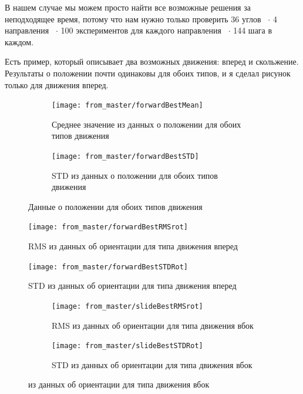 В нашем случае мы можем просто найти все возможные решения за неподходящее время, потому что нам нужно только проверить 36 углов ~$\cdot$ 4 направления ~$\cdot$ 100 экспериментов для каждого направления ~$\cdot$ 144 шага в каждом.


Есть пример, который описывает два возможных движения: вперед и скольжение. Результаты о положении почти одинаковы для обоих типов, и я сделал рисунок только для движения вперед.

\begin{figure}[H]
\begin{subfigure}{1\textwidth}
\centering\texttt{[image: from\_master/forwardBestMean]} 
\caption{Среднее значение из данных о положении для обоих типов движения}
\label{fig:forwardBestMean}
\end{subfigure}

\begin{subfigure}{1\textwidth}
\centering\texttt{[image: from\_master/forwardBestSTD]} 
\caption{STD из данных о положении для обоих типов движения}
\label{fig:forwardBestSTD}
\end{subfigure}
 
\caption{Данные о положении для обоих типов движения}
\label{fig:forwardPosion}
\end{figure}

\begin{figure}[H]
\centering\texttt{[image: from\_master/forwardBestRMSrot]} 
\caption{RMS из данных об ориентации для типа движения вперед}
\label{fig:forwardBestRMSrot}
\end{figure}

\begin{figure}[H]
\centering\texttt{[image: from\_master/forwardBestSTDRot]} 
\caption{STD из данных об ориентации для типа движения вперед}
\label{fig:forwardBestSTDRot}
\end{figure}

\begin{figure}[H]
\begin{subfigure}{1\textwidth}
\centering\texttt{[image: from\_master/slideBestRMSrot]} 
\caption{RMS из данных об ориентации для типа движения вбок}
\label{fig:slideBestRMSrot}
\end{subfigure}

\begin{subfigure}{1\textwidth}
\centering\texttt{[image: from\_master/slideBestSTDRot]} 
\caption{STD из данных об ориентации для типа движения вбок}
\label{fig:slideBestSTDRot}
\end{subfigure}
 
\caption{из данных об ориентации для типа движения вбок}
\label{fig:slideOrientation}
\end{figure}

